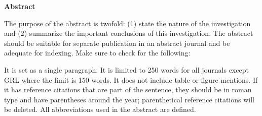 \textbf{Abstract}

The purpose of the abstract is twofold: (1) state the nature of the investigation and (2) summarize the important conclusions of this investigation. The abstract should be suitable for separate publication in an abstract journal and be adequate for indexing. Make sure to check for the following:

    It is set as a single paragraph.
    It is limited to 250 words for all journals except GRL where the limit is 150 words.
    It does not include table or figure mentions.
    If it has reference citations that are part of the sentence, they should be in roman type and have parentheses around the year; parenthetical reference citations will be deleted.
    All abbreviations used in the abstract are defined.

\pagebreak
